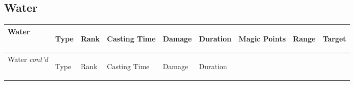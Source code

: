 \documentclass[twoside]{book}
\begin{document}
    

\subsection{Water}
    
\begin{longtable}{p{1.25in}lp{2em}p{3em}llp{7em}ll} 
  Water
  &
  \begin{turn}{70}{Type}\end{turn}
          
  &
  \begin{turn}{70}{Rank}\end{turn}
          
  &
  \begin{turn}{70}{Casting Time}\end{turn}
          
  &
  \begin{turn}{70}{Damage}\end{turn}
          
  &
  \begin{turn}{70}{Duration}\end{turn}
          
  &
  \begin{turn}{70}{Magic Points}\end{turn}
          
  &
  \begin{turn}{70}{Range}\end{turn}
          
  &
  \begin{turn}{70}{Target}\end{turn}
          
  \\
  \hline
  \hline
  \endfirsthead
  Water \textit{cont'd}
        
  &
  \begin{turn}{70}{Type}\end{turn}
          
  &
  \begin{turn}{70}{Rank}\end{turn}
          
  &
  \begin{turn}{70}{Casting Time}\end{turn}
          
  &
  \begin{turn}{70}{Damage}\end{turn}
          
  &
  \begin{turn}{70}{Duration}\end{turn}
          

\end{longtable}
\end{document}
